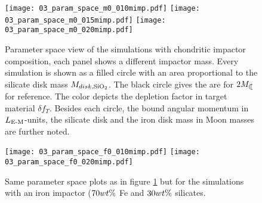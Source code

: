 

\begin{figure}
\begin{center}
\texttt{[image: 03\_param\_space\_m0\_010mimp.pdf]}
\texttt{[image: 03\_param\_space\_m0\_015mimp.pdf]}
\texttt{[image: 03\_param\_space\_m0\_020mimp.pdf]}
\caption{Parameter space view of the simulations with chondritic impactor composition, each panel shows a different impactor mass. Every simulation is shown as a filled circle with an area proportional to the silicate disk mass $M_{disk, \mathrm{SiO}_2}$. The black circle gives the are for $2 \ML$ for reference. The color depicts the depletion factor in target material $\delta f_T$. Besides each circle, the bound angular momentum in $L_{\textrm{E-M}}$-units, the silicate disk and the iron disk mass in Moon masses are further noted.}
\label{ch05_fig03a}
\end{center}
\end{figure}

\begin{figure}
\begin{center}
\texttt{[image: 03\_param\_space\_f0\_010mimp.pdf]}
\texttt{[image: 03\_param\_space\_f0\_020mimp.pdf]}
\caption{Same parameter space plots as in figure \ref{ch05_fig03a} but for the simulations with an iron impactor ($70 wt\mathrm{\%}$ Fe and $30 wt\mathrm{\%}$ silicates.}
\label{ch05_fig03b}
\end{center}
\end{figure}







